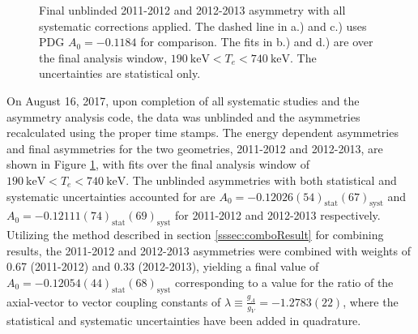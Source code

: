 \begin{figure}[h]
  \caption{Final unblinded 2011-2012 and 2012-2013 asymmetry with all systematic corrections applied. The dashed line in
    a.) and c.) uses PDG $A_0=-0.1184$ for comparison. The fits in b.) and d.) are over the
    final analysis window, $190\mathrm{~keV} < T_e < 740\mathrm{~keV}$. The uncertainties are statistical only.}
  \label{fig:FinalA}
\end{figure}

On August 16, 2017, upon completion of all systematic studies and the asymmetry analysis code, the data
was unblinded and the asymmetries recalculated using the proper time stamps. The energy dependent asymmetries
and final asymmetries for the two geometries, 2011-2012 and 2012-2013, are shown in Figure \ref{fig:FinalA},
with fits over the final analysis window of $190\mathrm{~keV} < T_e < 740\mathrm{~keV}$.
The unblinded asymmetries with both statistical and systematic uncertainties accounted for
are $A_0=-0.12026(54)_{\mathrm{stat}}(67)_{\mathrm{syst}}$ and $A_0=-0.12111(74)_{\mathrm{stat}}(69)_{\mathrm{syst}}$
for 2011-2012 and 2012-2013 respectively.
Utilizing the method described in section
\ref{sssec:comboResult} for combining results, the 2011-2012 and 2012-2013 asymmetries were combined
with weights of 0.67 (2011-2012) and 0.33 (2012-2013), yielding a final value of
$A_0=-0.12054(44)_{\mathrm{stat}}(68)_{\mathrm{syst}}$ corresponding to a
value for the ratio of the axial-vector to vector coupling constants of
$\lambda\equiv \frac{g_{A}}{g_{V}}=-1.2783(22)$, where the statistical and systematic
uncertainties have been added in quadrature.

